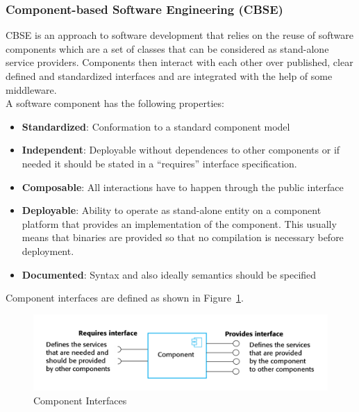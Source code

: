 \subsubsection{Component-based Software Engineering (CBSE)}
CBSE is an approach to software development that relies on the reuse of software components which are a set of classes that can be considered as stand-alone service providers.
Components then interact with each other over published, clear defined and standardized interfaces and are integrated with the help of some middleware.\\
A software component has the following properties:
\begin{itemize}
  \item \textbf{Standardized}: Conformation to a standard component model
  \item \textbf{Independent}: Deployable without dependences to other components or if needed it should be stated in a ``requires'' interface specification.
  \item \textbf{Composable}: All interactions have to happen through the public interface
  \item \textbf{Deployable}: Ability to operate as stand-alone entity on a component platform that provides an implementation of the component. This usually means that binaries are provided so that no compilation is necessary before deployment.
  \item \textbf{Documented}: Syntax and also ideally semantics should be specified
\end{itemize}

Component interfaces are defined as shown in Figure~\ref{fig:component_interfaces}.\\
\begin{figure}[H]
  \centering
  \includegraphics[width=.8\textwidth]{images/component_interfaces.png}
  \caption{Component Interfaces}\label{fig:component_interfaces}
\end{figure}

